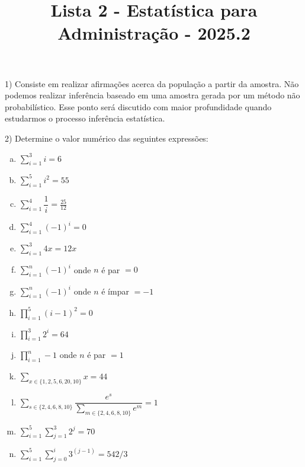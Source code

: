 \documentclass[12pt]{article}
\title{Lista 2 - Estatística para Administração - 2025.2}
\begin{document}
\date{}
\maketitle

1) Consiste em realizar afirmações acerca da população a partir da amostra. 
Não podemos realizar inferência baseado em uma amostra gerada por um método não probabilístico. Esse ponto será discutido com maior profundidade quando 
estudarmos o processo inferência estatística. 
\vspace{5px}

2) Determine o valor numérico das seguintes expressões:

\begin{enumerate}[a)] %
    \item $\sum\limits_{i = 1}^3 i = 6$ \\
    \item $\sum\limits_{i = 1}^5 i^2 = 55 $ \\
    \item $\sum\limits_{i = 1}^4 \dfrac{1}{i} = \frac{25}{12}$ \\
    \item $\sum\limits_{i = 1}^4 (-1)^{i} = 0$ \\
    \item $\sum\limits_{i = 1}^3 4x = 12x$ \\
    \item $\sum\limits_{i = 1}^n (-1)^{i}$ onde $n$ é par $=0$\\
    \item $\sum\limits_{i = 1}^n (-1)^{i}$ onde $n$ é ímpar $=-1$\\
    \item $\prod\limits_{i=1}^5 (i-1)^2 = 0$\\
    \item $\prod\limits_{i=1}^3 2^i = 64$\\
    \item $\prod\limits_{i=1}^n -1$ onde $n$ é par $=1$\\
    \item $\sum\limits_{x \in \{ 1, 2,5,6,20,10\}} x = 44$ \\ 
    \item $\sum\limits_{s \in \{ 2,4,6,8,10\}}  \dfrac{e^s}{\sum\limits_{m \in \{ 2,4,6,8,10\}} e^m}  = 1$ \\
    \item $\sum\limits_{i=1}^5\sum\limits_{j=1}^3 2^j = 70$
    \item $\sum\limits_{i=1}^5\sum\limits_{j=0}^i 3^{(j-1)} = 542/3$
\end{enumerate}
\vspace{5px}
\end{document}
